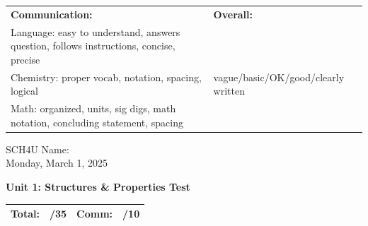 \documentclass[11pt]{article}
\newcommand{\headerbox}{
    \noindent\begin{tabular}{|p{11cm}|p{5.5cm}|}
    \hline
    \scriptsize \textbf{Communication:} & \scriptsize \textbf{Overall:}\\
    \scriptsize Language: easy to understand, answers question, follows instructions, concise, precise & \\
    \scriptsize Chemistry: proper vocab, notation, spacing, logical & \scriptsize \space\space \space\space vague/basic/OK/good/clearly written \\
    \scriptsize Math: organized, units, sig digs, math notation, concluding statement, spacing & \\
    \hline
    \end{tabular}
    \vspace{1em}
}
\begin{document}
\headerbox

\vspace{0.2cm}
SCH4U \hfill Name: \underline{\hspace{5cm}} \\
\indent \hfill Monday, March 1, 2025

\begin{center}
    \Large \textbf{Unit 1: Structures \& Properties Test}
\end{center}

\begin{center}
\begin{tabular}{|lc|lc|}
\hline
Total: & /35 & Comm: & /10 \\
\hline
\end{tabular}
\end{center}
\end{document}
